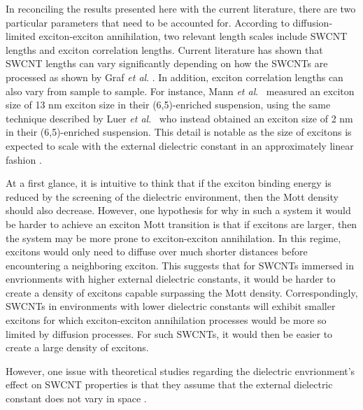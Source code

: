 In reconciling the results presented here with the current literature, there are two particular parameters that need to be accounted for. According to diffusion-limited exciton-exciton annihilation, two relevant length scales include SWCNT lengths and exciton correlation lengths. Current literature has shown that SWCNT lengths can vary significantly depending on how the SWCNTs are processed as shown by Graf \textit{et al}. \cite{graf2016large}. In addition, exciton correlation lengths can also vary from sample to sample. For instance, Mann \textit{et al}.\ \cite{mann201613} measured an exciton size of  13 nm exciton size in their (6,5)-enriched suspension, using the same technique described by Luer \textit{et al}.\ \cite{luer2009size} who instead obtained an exciton size of 2 nm in their (6,5)-enriched suspension. This detail is notable as the size of excitons is expected to scale with the external dielectric constant in an approximately linear fashion \cite{perebeinos2004scaling}.   %

At a first glance, it is intuitive to think that if the exciton binding energy is reduced by the screening of the dielectric environment, then the Mott density should also decrease. However, one hypothesis for why in such a system it would be harder to achieve an  exciton Mott transition is that if excitons are larger, then the system may be more prone to exciton-exciton annihilation. In this regime, excitons would only need to diffuse over much shorter distances before encountering a neighboring exciton. This suggests that for SWCNTs immersed in envrionments with higher external dielectric constants, it would be harder to create a density of excitons capable surpassing the Mott density. Correspondingly, SWCNTs in environments with lower dielectric constants will exhibit smaller excitons for which exciton-exciton annihilation processes would be more so limited by diffusion processes. For such SWCNTs, it would then be easier to create a large density of excitons.

However, one issue with theoretical studies regarding the dielectric envrionment's effect on SWCNT properties is that they assume that the external dielectric constant does not vary in space \cite{perebeinos2004scaling, ando2011effects}.

